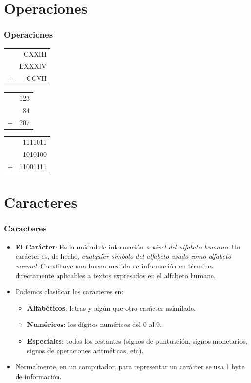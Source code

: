 \documentclass[aspectratio=169]{beamer}
\begin{document}
\section{Operaciones}
\begin{frame}\frametitle{Operaciones}
	\begin{center}
	\begin{tabular}{cr}
	  & CXXIII \\
	  & LXXXIV \\ \hline
	+ & CCVII\\
	\end{tabular}\hspace{2cm}
	\begin{tabular}{cr}
		& 123 \\
		& 84 \\ \hline
	  + & 207\\
	  \end{tabular}\hspace{2cm}
	  \begin{tabular}{cr}
		& 1111011 \\
		& 1010100 \\ \hline
	  + & 11001111\\
	  \end{tabular}
	\end{center}
\end{frame}	

\section{Caracteres}
\begin{frame}[fragile]\frametitle{Caracteres}
\begin{itemize}

\item \textbf{El Carácter}: Es la unidad de información \textit{a nivel del alfabeto humano}. Un carácter es, de hecho, \textit{cualquier símbolo del alfabeto usado como alfabeto normal}. Constituye una buena medida de información en términos directamente aplicables a textos expresados en el alfabeto humano.

\item Podemos clasificar los caracteres en:
	\begin{itemize}
		\item \textbf{Alfabéticos}: letras y algún que otro carácter asimilado.
		\item \textbf{Numéricos}: los dígitos numéricos del 0 al 9.
		\item \textbf{Especiales}: todos los restantes (signos de puntuación, signos monetarios, signos de operaciones aritméticas, etc).
	\end{itemize}
	\item Normalmente, en un computador, para representar un carácter se usa 1 byte de información.
\end{itemize}
\end{frame}
\end{document}
